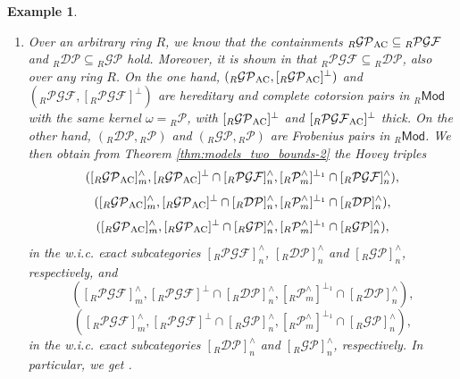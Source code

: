 \documentclass[10pt,reqno]{amsart}
\numberwithin{equation}{section}
\newtheorem{example}[definition]{Example}
\theoremstyle{remark}
\begin{document}
\begin{example}\label{ex:Ch-models-containments} ~\
\begin{enumerate}[(1)]
\item Over an arbitrary ring $R$, we know that the containments ${}_R\mathcal{GP}_{\rm AC} \subseteq {}_R\mathcal{PGF}$ and ${}_R\mathcal{DP} \subseteq {}_R\mathcal{GP}$ hold. Moreover, it is shown in \cite[Coroll. 1]{Alina2020} that ${}_R\mathcal{PGF} \subseteq {}_R\mathcal{DP}$, also over any ring $R$. On the one hand, $({}_R\mathcal{GP}_{\rm AC},[{}_R\mathcal{GP}_{\rm AC}]^\perp)$ and $({}_R\mathcal{PGF},[{}_R\mathcal{PGF}]^\perp)$ are hereditary and complete cotorsion pairs in ${}_R\mathsf{Mod}$ with the same kernel $\omega = {}_R\mathcal{P}$, with $[{}_R\mathcal{GP}_{\rm AC}]^\perp$ and $[{}_R\mathcal{PGF}_{\rm AC}]^\perp$ thick. On the other hand, $({}_R\mathcal{DP},{}_R\mathcal{P})$ and $({}_R\mathcal{GP},{}_R\mathcal{P})$ are Frobenius pairs in ${}_R\mathsf{Mod}$. We then obtain from Theorem \ref{thm:models_two_bounds-2} the Hovey triples
\[
([{}_R\mathcal{GP}_{\rm AC}]^\wedge_m, [{}_R\mathcal{GP}_{\rm AC}]^\perp \cap [{}_R\mathcal{PGF}]^\wedge_n, [{}_R\mathcal{P}^\wedge_m]^{\perp_1} \cap [{}_R\mathcal{PGF}]^\wedge_n),
\] 
\[
([{}_R\mathcal{GP}_{\rm AC}]^\wedge_m, [{}_R\mathcal{GP}_{\rm AC}]^\perp \cap [{}_R\mathcal{DP}]^\wedge_n, [{}_R\mathcal{P}^\wedge_m]^{\perp_1} \cap [{}_R\mathcal{DP}]^\wedge_n),
\] 
\[
([{}_R\mathcal{GP}_{\rm AC}]^\wedge_m, [{}_R\mathcal{GP}_{\rm AC}]^\perp \cap [{}_R\mathcal{GP}]^\wedge_n, [{}_R\mathcal{P}^\wedge_m]^{\perp_1} \cap [{}_R\mathcal{GP}]^\wedge_n),
\] 
in the w.i.c. exact subcategories $[{}_R\mathcal{PGF}]^\wedge_n$, $[{}_R\mathcal{DP}]^\wedge_n$ and $[{}_R\mathcal{GP}]^\wedge_n$, respectively, and 
\[
([{}_R\mathcal{PGF}]^\wedge_m, [{}_R\mathcal{PGF}]^\perp \cap [{}_R\mathcal{DP}]^\wedge_n, [{}_R\mathcal{P}^\wedge_m]^{\perp_1} \cap [{}_R\mathcal{DP}]^\wedge_n),
\] 
\[
([{}_R\mathcal{PGF}]^\wedge_m, [{}_R\mathcal{PGF}]^\perp \cap [{}_R\mathcal{GP}]^\wedge_n, [{}_R\mathcal{P}^\wedge_m]^{\perp_1} \cap [{}_R\mathcal{GP}]^\wedge_n),
\] 
in the w.i.c. exact subcategories $[{}_R\mathcal{DP}]^\wedge_n$ and $[{}_R\mathcal{GP}]^\wedge_n$, respectively. In particular, we get \cite[Coroll. 6.1 (3)]{Chains}.


\end{enumerate}
\end{example}
\end{document}
